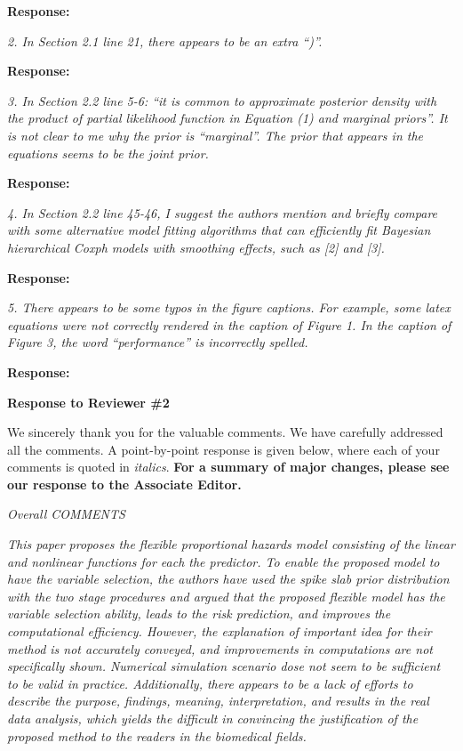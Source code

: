 \documentclass[11pt]{article}
\begin{document}
\medskip

\textbf{Response:} 

\bigskip

{\em 2. In Section 2.1 line 21, there appears to be an extra “)”.
}

\medskip

\textbf{Response:} 

\bigskip

{\em 3. In Section 2.2 line 5-6: “it is common to approximate posterior density with the product of partial likelihood function in Equation (1) and marginal priors”. It is not clear to me why the prior is “marginal”. The prior that appears in the equations seems to be the joint prior.}

\medskip

\textbf{Response:} 

\bigskip

{\em 4. In Section 2.2 line 45-46, I suggest the authors mention and briefly compare with some alternative model fitting algorithms that can efficiently fit Bayesian hierarchical Coxph models with smoothing effects, such as [2] and [3].}

\medskip

\textbf{Response:} 

\bigskip

{\em 5. There appears to be some typos in the figure captions. For example, some latex equations were not correctly rendered in the caption of Figure 1. In the caption of Figure 3, the word “performance” is incorrectly spelled.}

\medskip

\textbf{Response:} 


\newpage
{\bf Response to Reviewer \#2}

We sincerely thank you for the valuable comments. We have carefully addressed all the comments. A point-by-point response is given below, where each of your comments is quoted in {\em italics}. \textbf{For a summary of major changes, please see our response to the Associate Editor. }

\bigskip

{\em Overall COMMENTS}

\medskip

{\em This paper proposes the flexible proportional hazards model consisting of the linear and nonlinear functions for each the predictor. To enable the proposed model to have the variable selection, the authors have used the spike slab prior distribution with the two stage procedures and argued that the proposed flexible model has the variable selection ability, leads to the risk prediction, and improves the computational efficiency. However, the explanation of important idea for their method is not accurately conveyed, and improvements in computations are not specifically shown. Numerical simulation scenario dose not seem to be sufficient to be valid in practice. Additionally, there appears to be a lack of efforts to describe the purpose, findings, meaning, interpretation, and results in the real data analysis, which yields the difficult in convincing the justification of the proposed method to the readers in the biomedical fields.}
\end{document}

